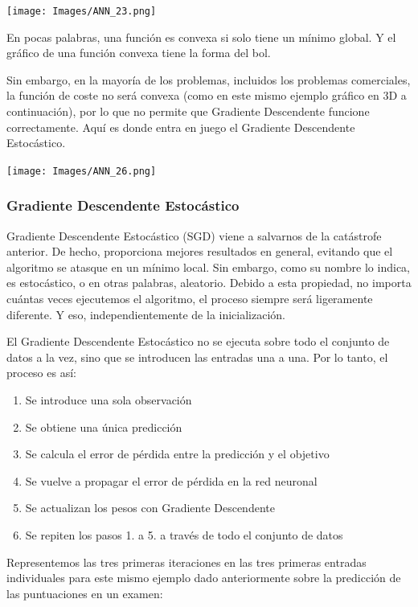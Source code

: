 \documentclass[
]{book}
\providecommand{\tightlist}{%
  \setlength{\itemsep}{0pt}\setlength{\parskip}{0pt}}
\begin{document}
\texttt{[image: Images/ANN\_23.png]}

En pocas palabras, una función es convexa si solo tiene un mínimo global. Y el gráfico de una función convexa tiene la forma del bol.

Sin embargo, en la mayoría de los problemas, incluidos los problemas comerciales, la función de coste no será convexa (como en este mismo ejemplo gráfico en 3D a continuación), por lo que no permite que Gradiente Descendente funcione correctamente. Aquí es donde entra en juego el Gradiente Descendente Estocástico.

\texttt{[image: Images/ANN\_26.png]}

\hypertarget{gradiente-descendente-estocuxe1stico}{%
\subsubsection{Gradiente Descendente Estocástico}\label{gradiente-descendente-estocuxe1stico}}

Gradiente Descendente Estocástico (SGD) viene a salvarnos de la catástrofe anterior. De hecho, proporciona mejores resultados en general, evitando que el algoritmo se atasque en un mínimo local. Sin embargo, como su nombre lo indica, es estocástico, o en otras palabras, aleatorio. Debido a esta propiedad, no importa cuántas veces ejecutemos el algoritmo, el proceso siempre será ligeramente diferente. Y eso, independientemente de la inicialización.

El Gradiente Descendente Estocástico no se ejecuta sobre todo el conjunto de datos a la vez, sino que se introducen las entradas una a una. Por lo tanto, el proceso es así:

\begin{enumerate}
\def\labelenumi{\arabic{enumi}.}
\tightlist
\item
  Se introduce una sola observación
\item
  Se obtiene una única predicción
\item
  Se calcula el error de pérdida entre la predicción y el objetivo
\item
  Se vuelve a propagar el error de pérdida en la red neuronal
\item
  Se actualizan los pesos con Gradiente Descendente
\item
  Se repiten los pasos 1. a 5. a través de todo el conjunto de datos
\end{enumerate}

Representemos las tres primeras iteraciones en las tres primeras entradas individuales para este mismo ejemplo dado anteriormente sobre la predicción de las puntuaciones en un examen:
\end{document}
